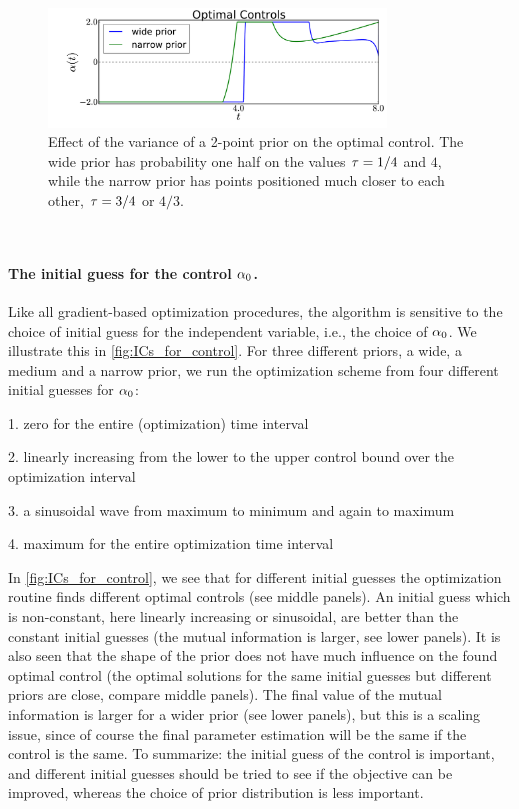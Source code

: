 \documentclass{article}
\begin{document}
\begin{figure}[htp]
\begin{center}
  \includegraphics[width=0.8\textwidth]{Figs/AdjointOptimizer/PriorSpread.pdf}
  \caption[Effect of the variance of a prior on the Optimal Control]{Effect of
  the variance of a 2-point prior on the optimal control. The wide prior has probability one half on the values ${ \tau } =  1/4$
  and $4$, while the narrow prior has points positioned much
   closer to each other, ${ \tau } =   3/4$ or $4/3$.  }
  \label{fig:prior_dispersion_impact} 
\end{center}
\end{figure}

\

\paragraph{The initial guess for the control ${\alpha}_0$.}

Like all gradient-based optimization procedures, the algorithm is sensitive to the choice
of initial guess for the independent variable, i.e., the choice of
${\alpha}_0$. We illustrate this in \cref{fig:ICs_for_control}. For three
different priors, a wide, a medium and a narrow prior, we run the
optimization scheme from four different initial guesses for 
${\alpha}_0$:

1. zero for the entire (optimization) time interval

2. linearly increasing from the lower to the upper control bound over the
optimization interval

3. a sinusoidal wave from maximum to minimum and again to maximum

4. maximum for the entire optimization time interval 

In \cref{fig:ICs_for_control}, we see that for different initial guesses the
optimization routine finds different optimal controls (see middle panels).  An
initial guess which is non-constant, here linearly increasing or
sinusoidal, are better than the constant initial guesses (the mutual
information is larger, see lower panels). It is also
seen that the shape of the prior does not have much influence on the found
optimal control (the optimal solutions for the same initial guesses but
different priors are close, compare middle panels). The final value of
the mutual information is larger 
for a wider prior (see lower panels), but this is a scaling issue, since of course the
final parameter estimation will be the same if the control is the
same. To summarize: the initial guess of the control is important, and
different initial guesses should be tried to see if the objective can
be improved, whereas the choice of prior distribution is less
important.  
\end{document}
